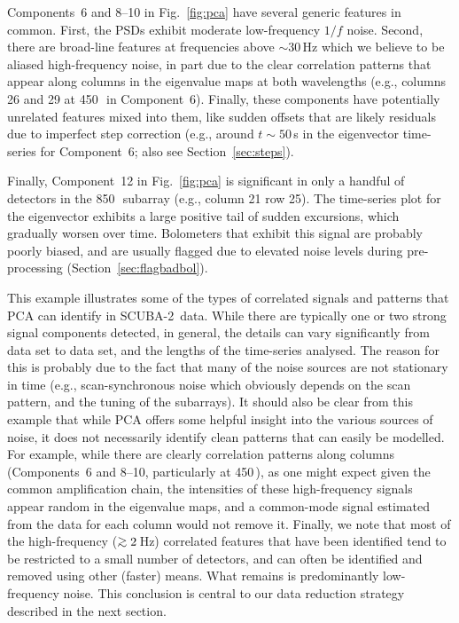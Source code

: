 \documentclass[useAMS,usenatbib,nofootinbib]{mn2e}
\newcommand{\scuba}{SCUBA-2}
\def\gsim{\mathrel{\lower2.5pt\vbox{\lineskip=0pt\baselineskip=0pt
          \hbox{$>$}\hbox{$\sim$}}}}
\begin{document}
Components~6 and 8--10 in Fig.~\ref{fig:pca} have several generic
features in common. First, the PSDs exhibit moderate low-frequency
$1/f$ noise. Second, there are broad-line features at frequencies
above $\sim$30\,Hz which we believe to be aliased high-frequency
noise, in part due to the clear correlation patterns that appear along
columns in the eigenvalue maps at both wavelengths (e.g., columns 26
and 29 at 450\,\micron\ in Component~6). Finally, these components
have potentially unrelated features mixed into them, like sudden
offsets that are likely residuals due to imperfect step correction
(e.g., around $t\sim50$\,s in the eigenvector time-series for
Component~6; also see Section~\ref{sec:steps}).

Finally, Component~12 in Fig.~\ref{fig:pca} is significant in only a
handful of detectors in the 850\,\micron\ subarray (e.g., column 21
row 25). The time-series plot for the eigenvector exhibits a large
positive tail of sudden excursions, which gradually worsen over
time. Bolometers that exhibit this signal are probably poorly biased,
and are usually flagged due to elevated noise levels during
pre-processing (Section~\ref{sec:flagbadbol}).

This example illustrates some of the types of correlated signals and
patterns that PCA can identify in \scuba\ data. While there are
typically one or two strong signal components detected, in general,
the details can vary significantly from data set to data set, and the
lengths of the time-series analysed. The reason for this is probably
due to the fact that many of the noise sources are not stationary in
time (e.g., scan-synchronous noise which obviously depends on the scan
pattern, and the tuning of the subarrays). It should also be clear
from this example that while PCA offers some helpful insight into the
various sources of noise, it does not necessarily identify clean
patterns that can easily be modelled. For example, while there are
clearly correlation patterns along columns (Components~6 and 8--10,
particularly at 450\,\micron), as one might expect given the common
amplification chain, the intensities of these high-frequency signals
appear random in the eigenvalue maps, and a common-mode signal
estimated from the data for each column would not remove it. Finally,
we note that most of the high-frequency ($\gsim2$\,Hz) correlated
features that have been identified tend to be restricted to a small
number of detectors, and can often be identified and removed using
other (faster) means. What remains is predominantly low-frequency
noise. This conclusion is central to our data reduction strategy
described in the next section.
\end{document}
